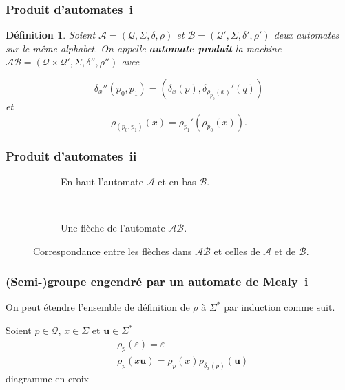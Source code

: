 \documentclass[11pt]{beamer}
\newtheorem{defi}{Définition}
\begin{document}
\begin{frame}
  \frametitle{Produit d'automates~i}
  \begin{defi}
    \label{def:produit}
    Soient $\mathcal{A} = \left(\mathcal{Q}, \Sigma, \delta, \rho\right)$ et $\mathcal{B} = \left(\mathcal{Q'}, \Sigma, \delta', \rho'\right)$ deux automates sur le même alphabet. On appelle \textbf{\textit{automate produit}} la machine $\mathcal{AB} = \left(\mathcal{Q}\times\mathcal{Q'}, \Sigma, \delta'', \rho''\right)$ avec

    \[ \delta_x''(p_0, p_1) = (\delta_x(p), \delta_{\rho_{p_0}(x)}'(q))\]
    et
    \[ \rho_{(p_0,p_1)}(x) = \rho_{p_1}'(\rho_{p_0}(x)). \]
  \end{defi}
\end{frame}

\begin{frame}
  \frametitle{Produit d'automates~ii}
  \begin{figure}[h!]
    \begin{subfigure}[b]{0.3\textwidth}
      \centering
      \caption{En haut l'automate $\mathcal{A}$ et en bas $\mathcal{B}$.}
    \end{subfigure}
    ~
    \begin{subfigure}[b]{0.3\textwidth}
      \centering
      \caption{Une flèche de l'automate $\mathcal{AB}$.}
    \end{subfigure}
    \caption{Correspondance entre les flèches dans $\mathcal{AB}$ et celles de $\mathcal{A}$ et de $\mathcal{B}$.}
  \end{figure}
\end{frame}

\begin{frame}
  \frametitle{(Semi-)groupe engendré par un automate de Mealy~i}

  On peut étendre l'ensemble de définition de $\rho$ à $\Sigma^*$ par induction comme suit.

  Soient $p\in\mathcal{Q}$, $x\in\Sigma$ et $\textbf{u}\in\Sigma^*$
  \begin{align*}
    &\rho_p(\varepsilon)=\varepsilon \\
    &\rho_p(x\textbf{u})=\rho_p(x)\rho_{\delta_x(p)}(\textbf{u})
  \end{align*}
  diagramme en croix

\end{frame}
\end{document}

